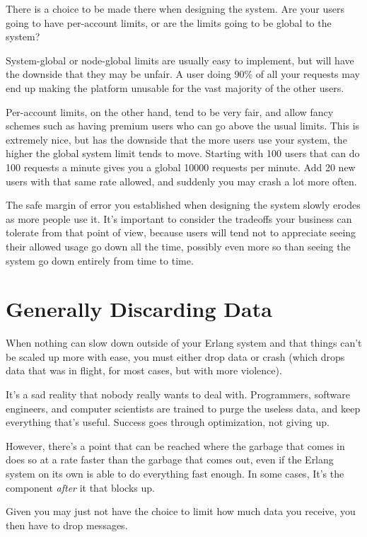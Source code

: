 \documentclass[11pt, oneside]{book}   	%
\begin{document}
There is a choice to be made there when designing the system. Are your users going to have per-account limits, or are the limits going to be global to the system?

System-global or node-global limits are usually easy to implement, but will have the downside that they may be unfair. A user doing 90\% of all your requests may end up making the platform unusable for the vast majority of the other users.

Per-account limits, on the other hand, tend to be very fair, and allow fancy schemes such as having premium users who can go above the usual limits. This is extremely nice, but has the downside that the more users use your system, the higher the global system limit tends to move. Starting with 100 users that can do 100 requests a minute gives you a global 10000 requests per minute. Add 20 new users with that same rate allowed, and suddenly you may crash a lot more often.

The safe margin of error you established when designing the system slowly erodes as more people use it. It's important to consider the tradeoffs your business can tolerate from that point of view, because users will tend not to appreciate seeing their allowed usage go down all the time, possibly even more so than seeing the system go down entirely from time to time.


\section{Generally Discarding Data}

When nothing can slow down outside of your Erlang system and that things can't be scaled up more with ease, you must either drop data or crash (which drops data that was in flight, for most cases, but with more violence).

It's a sad reality that nobody really wants to deal with. Programmers, software engineers, and computer scientists are trained to purge the useless data, and keep everything that's useful. Success goes through optimization, not giving up.

However, there's a point that can be reached where the garbage that comes in does so at a rate faster than the garbage that comes out, even if the Erlang system on its own is able to do everything fast enough. In some cases, It's the component \emph{after} it that blocks up.

Given you may just not have the choice to limit how much data you receive, you then have to drop messages.
\end{document}
